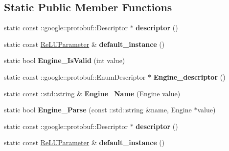 \subsection*{Static Public Member Functions}
\begin{DoxyCompactItemize}
\item 
\mbox{\label{classcaffe_1_1_re_l_u_parameter_a5052311c59cb68a6074a65243518e092}} 
static const \+::google\+::protobuf\+::\+Descriptor $\ast$ {\bfseries descriptor} ()
\item 
\mbox{\label{classcaffe_1_1_re_l_u_parameter_a3c9814bbfc2d72b3c03141edd1a4ad18}} 
static const \mbox{\hyperlink{classcaffe_1_1_re_l_u_parameter}{Re\+L\+U\+Parameter}} \& {\bfseries default\+\_\+instance} ()
\item 
\mbox{\label{classcaffe_1_1_re_l_u_parameter_ae7170b93f259002e14a6b00dd81be6fc}} 
static bool {\bfseries Engine\+\_\+\+Is\+Valid} (int value)
\item 
\mbox{\label{classcaffe_1_1_re_l_u_parameter_a3b214bc9be6d28ada18e5a9e269a31d7}} 
static const \+::google\+::protobuf\+::\+Enum\+Descriptor $\ast$ {\bfseries Engine\+\_\+descriptor} ()
\item 
\mbox{\label{classcaffe_1_1_re_l_u_parameter_a7f5e772e25e9206833001f3438c35628}} 
static const \+::std\+::string \& {\bfseries Engine\+\_\+\+Name} (Engine value)
\item 
\mbox{\label{classcaffe_1_1_re_l_u_parameter_a7b2c52ed83dde5d29fbab2d2941b7f7b}} 
static bool {\bfseries Engine\+\_\+\+Parse} (const \+::std\+::string \&name, Engine $\ast$value)
\item 
\mbox{\label{classcaffe_1_1_re_l_u_parameter_a7b64a132c8b884f5ad8238293c2c5a0c}} 
static const \+::google\+::protobuf\+::\+Descriptor $\ast$ {\bfseries descriptor} ()
\item 
\mbox{\label{classcaffe_1_1_re_l_u_parameter_a1acfac67c38d2566251b82cec66a60c0}} 
static const \mbox{\hyperlink{classcaffe_1_1_re_l_u_parameter}{Re\+L\+U\+Parameter}} \& {\bfseries default\+\_\+instance} ()

\end{DoxyCompactItemize}
